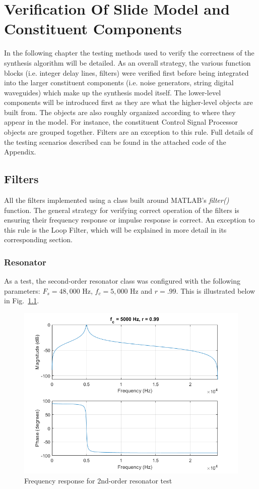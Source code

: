 \documentclass[../main.tex]{subfiles}
\begin{document}
\chapter{Verification Of Slide Model and Constituent Components}

In the following chapter the testing methods used to verify the correctness of the synthesis algorithm will be detailed. As an overall strategy, the various function blocks (i.e. integer delay lines, filters) were verified first before being integrated into the larger constituent components (i.e. noise generators, string digital waveguides) which make up the synthesis model itself. The lower-level components will be introduced first as they are what the higher-level objects are built from. The objects are also roughly organized according to where they appear in the model. For instance, the constituent Control Signal Processor objects are grouped together. Filters are an exception to this rule. Full details of the testing scenarios described can be found in the attached code of the Appendix.

\section{Filters}
All the filters implemented using a class built around MATLAB's \emph{filter()} function. The general strategy for verifying correct operation of the filters is ensuring their frequency response or impulse response is correct. An exception to this rule is the Loop Filter, which will be explained in more detail in its corresponding section.

\subsection{Resonator}
As a test, the second-order resonator class was configured with the following parameters: $F_s = 48,000 \text{ Hz}$, $f_c = 5,000 \text{ Hz}$ and $r = .99$. This is illustrated below in Fig.~\ref{fig:ResoTest}.

\begin{figure}[h]
    \centering
    \includegraphics[scale=.65]{./images/plots/ResonatorTest.png}
    \caption{Frequency response for 2nd-order resonator test}
    \label{fig:ResoTest}
\end{figure}
\end{document}
